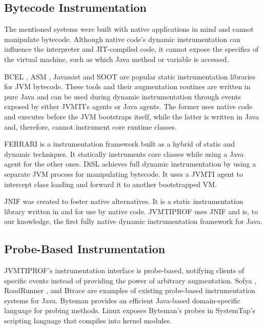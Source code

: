 \subsection{Bytecode Instrumentation}

The mentioned systems were built with native applications in mind and cannot manipulate bytecode. Although native code's dynamic instrumentation can influence the interpreter and JIT-compiled code, it cannot expose the specifics of the virtual machine, such as which Java method or variable is accessed.

BCEL \cite{dahm1999bcel}, ASM \cite{bruneton2002asm}, Javassist \cite{chiba2003javassist} and SOOT \cite{vallee2010soot} are popular static instrumentation libraries for JVM bytecode. These tools and their augmentation routines are written in pure Java and can be used during dynamic instrumentation through events exposed by either JVMTI's agents or Java agents. The former uses native code and executes before the JVM bootstraps itself, while the latter is written in Java and, therefore, cannot instrument core runtime classes.

FERRARI \cite{binder2007ferrari} is a instrumentation framework built as a hybrid of static and dynamic techniques. It statically instruments core classes while using a Java agent for the other ones. DiSL \cite{marek2012disl} achieves full dynamic instrumentation by using a separate JVM process for manipulating bytecode. It uses a JVMTI agent to intercept class loading and forward it to another bootstrapped VM.

JNIF \cite{mastrangelo2014jnif} was created to foster native alternatives. It is a static instrumentation library written in and for use by native code. JVMTIPROF uses JNIF and is, to our knowledge, the first fully native dynamic instrumentation framework for Java.

\subsection{Probe-Based Instrumentation}

JVMTIPROF's instrumentation interface is probe-based, notifying clients of specific events instead of providing the power of arbitrary augmentation. Sofya \cite{kinneer2007sofya}, RoadRunner \cite{flanagan2010roadrunner}, and Btrace \cite{btrace} are examples of existing probe-based instrumentation systems for Java. Byteman \cite{dinn2011byteman} provides an efficient Java-based domain-specific language for probing methods. Linux exposes Byteman's probes in SystemTap's \cite{prasad2005stap} scripting language that compiles into kernel modules.

